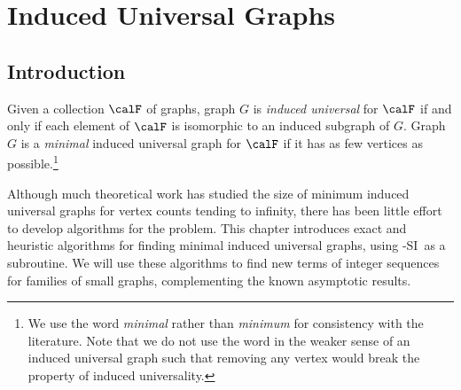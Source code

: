 \chapter{Induced Universal Graphs}
\label{c:universal-graphs}

%
%

\section{Introduction}

Given a collection $\calF$ of graphs, graph $G$ is \emph{induced universal} for
$\calF$ if and only if each element of $\calF$ is isomorphic to an induced subgraph of $G$.
Graph $G$ is a \emph{minimal} induced universal graph for $\calF$ if it has as
few vertices as possible.\footnote{We use the word \emph{minimal}
rather than \emph{minimum} for consistency
with the literature. Note that we do not use the word in the weaker sense
of an induced universal graph such that removing any vertex would break the property of induced
universality.}

Although much theoretical work has studied the size of minimum
induced universal graphs for vertex counts tending to infinity, there
has been little effort to develop algorithms
for the problem.
This chapter introduces exact and heuristic algorithms for finding
minimal induced universal graphs, using
\McSplit-SI\ as a subroutine.
We will use these algorithms to find
new terms of integer sequences for
families of small graphs, complementing the known asymptotic results.

